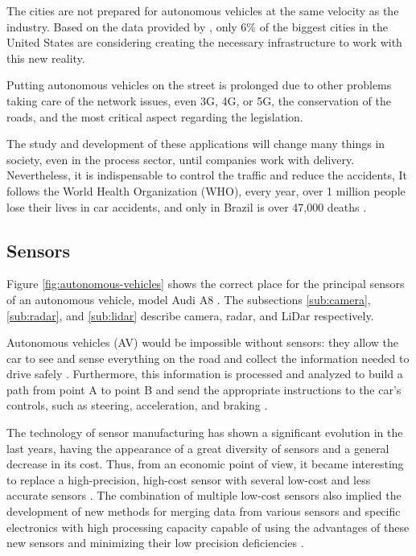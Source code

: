 The cities are not prepared for autonomous vehicles at the same velocity as the industry. Based on the data provided by \cite{cutler2015many}, only 6\% of the biggest cities in the United States are considering creating the necessary infrastructure to work with this new reality.

Putting autonomous vehicles on the street is prolonged due to other problems taking care of the network issues, even 3G, 4G, or 5G, the conservation of the roads, and the most critical aspect regarding the legislation. 

The study and development of these applications will change many things in society, even in the process sector, until companies work with delivery. Nevertheless, it is indispensable to control the traffic and reduce the accidents, It follows the World Health Organization (WHO), every year, over 1 million people lose their lives in car accidents, and only in Brazil is over 47,000 deaths \cite{world2004world}. 





\subsection{Sensors}\label{sensors}

Figure \ref{fig:autonomous-vehicles} shows the correct place for the principal sensors of an autonomous vehicle, model Audi A8 \cite{ross2017audi}. The subsections \ref{sub:camera}, \ref{sub:radar}, and
\ref{sub:lidar} describe camera, radar, and LiDar respectively. 

Autonomous vehicles (AV) would be impossible without sensors: they allow the car to see and sense everything on the road and collect the information needed to drive safely \cite{kocic2018sensors}. Furthermore, this information is processed and analyzed to build a path from point A to point B and send the appropriate instructions to the car's controls, such as steering, acceleration, and braking \cite{kato2015open}.

The technology of sensor manufacturing has shown a significant evolution in the last years, having the appearance of a great diversity of sensors and a general decrease in its cost. Thus, from an economic point of view, it became interesting to replace a high-precision, high-cost sensor with several low-cost and less accurate sensors \cite{varghese2015overview}. The combination of multiple low-cost sensors also implied the development of new methods for merging data from various sensors and specific electronics with high processing capacity capable of using the advantages of these new sensors and minimizing their low precision deficiencies \cite{krasniqi2016use}.


